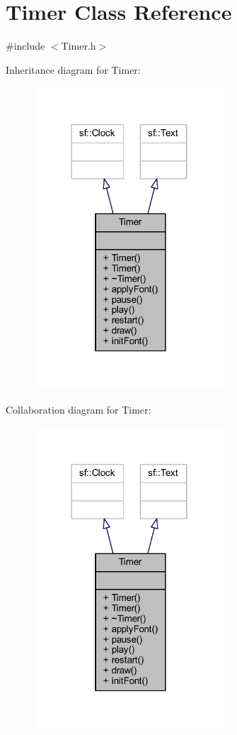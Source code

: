 \hypertarget{class_timer}{}\section{Timer Class Reference}
\label{class_timer}


{\ttfamily \#include $<$Timer.\+h$>$}



Inheritance diagram for Timer\+:\nopagebreak
\begin{figure}[H]
\begin{center}
\leavevmode
\includegraphics[width=202pt]{class_timer__inherit__graph}
\end{center}
\end{figure}


Collaboration diagram for Timer\+:\nopagebreak
\begin{figure}[H]
\begin{center}
\leavevmode
\includegraphics[width=202pt]{class_timer__coll__graph}
\end{center}
\end{figure}
